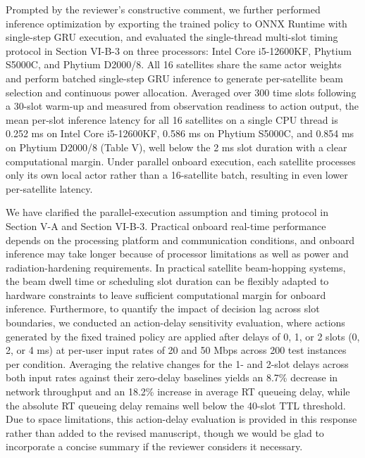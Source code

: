 \documentclass[11pt,a4paper]{article}
\newcommand{\qrev}[1]{{\color{qinrev}#1}}
\begin{document}
Prompted by the reviewer's constructive comment, we further performed inference optimization by exporting the trained policy to ONNX Runtime with single-step GRU execution, and evaluated the \qrev{single-thread} multi-slot timing protocol in \qrev{Section VI-B-3} \qrev{on three processors: Intel Core i5-12600KF, Phytium S5000C, and Phytium D2000/8}. All 16 satellites share the same actor weights and perform batched single-step GRU inference to generate per-satellite beam selection and continuous power allocation. Averaged over 300 time slots following a 30-slot warm-up and measured from observation readiness to action output, the mean per-slot inference latency for all 16 satellites on a single CPU thread is \qrev{0.252 ms on Intel Core i5-12600KF, 0.586 ms on Phytium S5000C, and} 0.854 ms \qrev{on Phytium D2000/8 (Table V)}, well below the 2 ms slot duration with a clear computational margin. Under parallel onboard execution, each satellite processes only its own local actor rather than a 16-satellite batch, resulting in even lower per-satellite latency.
\par

We have clarified the parallel-execution assumption and timing protocol in Section V-A and \qrev{Section VI-B-3}. Practical onboard real-time performance depends on the processing platform and communication conditions, and onboard inference may take longer because of processor limitations as well as power and radiation-hardening requirements. In practical satellite beam-hopping systems, the beam dwell time or scheduling slot duration can be flexibly adapted to hardware constraints to leave sufficient computational margin for onboard inference. Furthermore, to quantify the impact of decision lag across slot boundaries, \qrev{we conducted an action-delay sensitivity evaluation}, where actions generated by the fixed trained policy are applied after delays of 0, 1, or 2 slots (0, 2, or 4 ms) at per-user input rates of 20 and 50 Mbps across 200 test instances per condition. Averaging the relative changes for the 1- and 2-slot delays across both input rates against their zero-delay baselines yields an 8.7\% decrease in network throughput and an 18.2\% increase in average RT queueing delay, while the absolute RT queueing delay remains well below the 40-slot TTL threshold. \qrev{Due to space limitations, this action-delay evaluation is provided in this response rather than added to the revised manuscript, though we would be glad to incorporate a concise summary if the reviewer considers it necessary.}
\par
\end{document}
